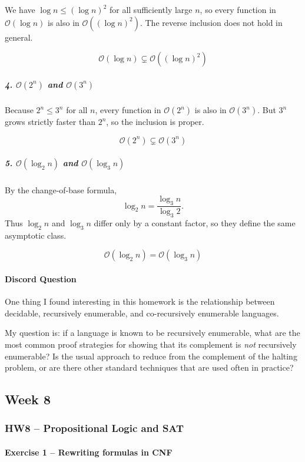\documentclass[11pt, a4paper]{article}
\theoremstyle{definition}
\theoremstyle{remark}
\begin{document}
We have $\log n \le (\log n)^2$ for all sufficiently large $n$, so every function in $\mathcal{O}(\log n)$ is also in $\mathcal{O}((\log n)^2)$.
The reverse inclusion does not hold in general.

\[
\boxed{\mathcal{O}(\log n) \subsetneq \mathcal{O}((\log n)^2)}
\]

\subparagraph{4. $\mathcal{O}(2^n)$ and $\mathcal{O}(3^n)$}

Because $2^n \le 3^n$ for all $n$, every function in $\mathcal{O}(2^n)$ is also in $\mathcal{O}(3^n)$.
But $3^n$ grows strictly faster than $2^n$, so the inclusion is proper.

\[
\boxed{\mathcal{O}(2^n) \subsetneq \mathcal{O}(3^n)}
\]

\subparagraph{5. $\mathcal{O}(\log_2 n)$ and $\mathcal{O}(\log_3 n)$}

By the change-of-base formula,
\[
\log_2 n = \frac{\log_3 n}{\log_3 2}.
\]
Thus $\log_2 n$ and $\log_3 n$ differ only by a constant factor, so they define the same asymptotic class.

\[
\boxed{\mathcal{O}(\log_2 n) = \mathcal{O}(\log_3 n)}
\]

\paragraph{Discord Question}

One thing I found interesting in this homework is the relationship between decidable, recursively enumerable, and co-recursively enumerable languages. 

My question is: if a language is known to be recursively enumerable, what are the most common proof strategies for showing that its complement is \emph{not} recursively enumerable? Is the usual approach to reduce from the complement of the halting problem, or are there other standard techniques that are used often in practice?

\subsection{Week 8}
\subsubsection*{HW8 -- Propositional Logic and SAT}

\paragraph{Exercise 1 -- Rewriting formulas in CNF}
\end{document}
